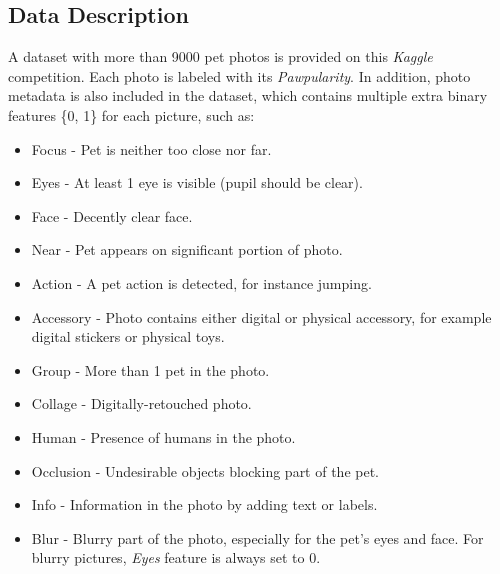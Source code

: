 \documentclass{article}
\begin{document}
\subsection{Data Description}
A dataset with more than 9000 pet photos is provided on this \textit{Kaggle} competition. Each photo is labeled with its \textit{Pawpularity}. In addition, photo metadata is also included in the dataset, which contains multiple extra binary features \{0, 1\} for each picture, such as:
\begin{itemize}
   \item Focus - Pet is neither too close nor far.
   \item Eyes - At least 1 eye is visible (pupil should be clear).
   \item Face - Decently clear face.
   \item Near - Pet appears on significant portion of photo.
   \item Action - A pet action is detected, for instance jumping.
   \item Accessory - Photo contains either digital or physical accessory, for example digital stickers or physical toys.
   \item Group - More than 1 pet in the photo.
   \item Collage - Digitally-retouched photo.
   \item Human - Presence of humans in the photo.
   \item Occlusion - Undesirable objects blocking part of the pet.
   \item Info - Information in the photo by adding text or labels.
   \item Blur - Blurry part of the photo, especially for the pet’s eyes and face. For blurry pictures, \textit{Eyes} feature is always set to 0.
 \end{itemize}
\end{document}
